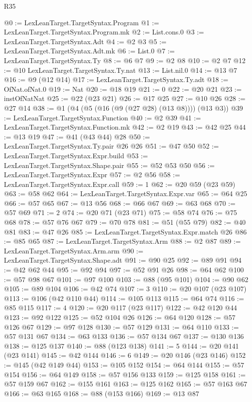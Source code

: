 \begin{lexlean}{R35}
\begin{coremodule}
@0 := LexLeanTarget.TargetSyntax.Program
@1 := LexLeanTarget.TargetSyntax.Program.mk
@2 := List.cons.{0}
@3 := LexLeanTarget.TargetSyntax.Adt
@4 := @2 @3
@5 := LexLeanTarget.TargetSyntax.Adt.mk
@6 := List.{0}
@7 := LexLeanTarget.TargetSyntax.Ty
@8 := @6 @7
@9 := @2 @8
@10 := @2 @7
@12 := @10 LexLeanTarget.TargetSyntax.Ty.nat
@13 := List.nil.{0}
@14 := @13 @7
@16 := @9 (@12 @14)
@17 := LexLeanTarget.TargetSyntax.Ty.adt
@18 := OfNat.ofNat.{0}
@19 := Nat
@20 := @18 @19
@21 := 0
@22 := @20 @21
@23 := instOfNatNat
@25 := @22 (@23 @21)
@26 := @17 @25
@27 := @10 @26
@28 := @27 @14
@38 := @1 (@4 (@5 (@16 (@9 (@27 @28) (@13 @8)))) (@13 @3))
@39 := LexLeanTarget.TargetSyntax.Function
@40 := @2 @39
@41 := LexLeanTarget.TargetSyntax.Function.mk
@42 := @2 @19
@43 := @42 @25
@44 := @13 @19
@47 := @41 (@43 @44) @28
@50 := LexLeanTarget.TargetSyntax.Ty.pair @26 @26
@51 := @47 @50
@52 := LexLeanTarget.TargetSyntax.Expr.build
@53 := LexLeanTarget.TargetSyntax.Shape.pair
@55 := @52 @53 @50
@56 := LexLeanTarget.TargetSyntax.Expr
@57 := @2 @56
@58 := LexLeanTarget.TargetSyntax.Expr.call
@59 := 1
@62 := @20 @59 (@23 @59)
@63 := @58 @62
@64 := LexLeanTarget.TargetSyntax.Expr.var
@65 := @64 @25
@66 := @57 @65
@67 := @13 @56
@68 := @66 @67
@69 := @63 @68
@70 := @57 @69
@71 := 2
@74 := @20 @71 (@23 @71)
@75 := @58 @74
@76 := @75 @68
@78 := @57 @76 @67
@79 := @70 @78
@81 := @51 (@55 @79)
@82 := @40 @81
@83 := @47 @26
@85 := LexLeanTarget.TargetSyntax.Expr.match @26
@86 := @85 @65
@87 := LexLeanTarget.TargetSyntax.Arm
@88 := @2 @87
@89 := LexLeanTarget.TargetSyntax.Arm.arm
@90 := LexLeanTarget.TargetSyntax.Shape.adt
@91 := @90 @25
@92 := @89 @91
@94 := @42 @62 @44
@95 := @92 @94
@97 := @52 @91 @26
@98 := @64 @62
@100 := @57 @98 @67
@101 := @97 @100
@103 := @88 (@95 @101)
@104 := @90 @62
@105 := @89 @104
@106 := @42 @74
@107 := 3
@110 := @20 @107 (@23 @107)
@113 := @106 (@42 @110 @44)
@114 := @105 @113
@115 := @64 @74
@116 := @85 @115
@117 := 4
@120 := @20 @117 (@23 @117)
@122 := @42 @120 @44
@123 := @92 @122
@125 := @52 @104 @26
@126 := @64 @120
@128 := @57 @126 @67
@129 := @97 @128
@130 := @57 @129
@131 := @64 @110
@133 := @57 @131 @67
@134 := @63 @133
@136 := @57 @134 @67
@137 := @130 @136
@138 := @125 @137
@140 := @88 (@123 @138)
@141 := 5
@144 := @20 @141 (@23 @141)
@145 := @42 @144
@146 := 6
@149 := @20 @146 (@23 @146)
@152 := @145 (@42 @149 @44)
@153 := @105 @152
@154 := @64 @144
@155 := @57 @154
@156 := @64 @149
@158 := @57 @156 @133
@159 := @125 @158
@161 := @57 @159 @67
@162 := @155 @161
@163 := @125 @162
@165 := @57 @163 @67
@166 := @63 @165
@168 := @88 (@153 @166)
@169 := @13 @87

\end{coremodule}
\end{lexlean}
